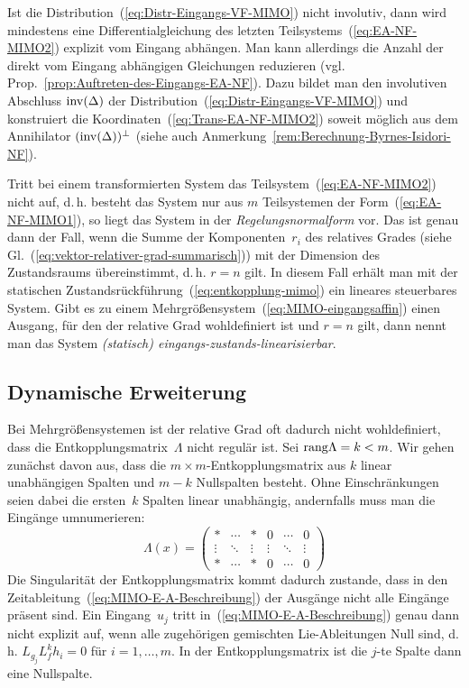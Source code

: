 Ist die Distribution~(\ref{eq:Distr-Eingangs-VF-MIMO}) nicht involutiv,
dann wird mindestens eine Differentialgleichung des letzten Teilsystems~(\ref{eq:EA-NF-MIMO2})
explizit vom Eingang abhängen. Man kann allerdings die Anzahl der
direkt vom Eingang abhängigen Gleichungen reduzieren (vgl. Prop.~\ref{prop:Auftreten-des-Eingangs-EA-NF}).
Dazu bildet man den involutiven Abschluss ${\operatorname{inv}}(\Delta)$ der Distribution~(\ref{eq:Distr-Eingangs-VF-MIMO})
und konstruiert die Koordinaten~(\ref{eq:Trans-EA-NF-MIMO2}) soweit
möglich aus dem Annihilator $({\operatorname{inv}}(\Delta))^{\perp}$ (siehe auch
Anmerkung~\ref{rem:Berechnung-Byrnes-Isidori-NF}).

\medskip{}

Tritt bei einem transformierten System das Teilsystem~(\ref{eq:EA-NF-MIMO2})
nicht auf, d.\,h. besteht das System nur aus $m$ Teilsystemen der
Form~(\ref{eq:EA-NF-MIMO1}), so liegt das System in der \emph{Regelungsnormalform}
vor. Das ist genau dann der Fall, wenn die Summe der Komponenten~$r_{i}$
des relatives Grades (siehe Gl.~(\ref{eq:vektor-relativer-grad-summarisch}))
mit der Dimension des Zustandsraums übereinstimmt, d.\,h. $r=n$
gilt. In diesem Fall erhält man mit der statischen Zustandsrückführung~(\ref{eq:entkopplung-mimo})
ein lineares steuerbares System. Gibt es zu einem Mehrgrößensystem~(\ref{eq:MIMO-eingangsaffin})
einen Ausgang, für den der relative Grad wohldefiniert ist und $r=n$
gilt, dann nennt man das System \emph{(statisch) eingangs-zustands-linearisierbar}.

\subsection{Dynamische Erweiterung\label{subsec:Dynamische-Erweiterung}}

Bei Mehrgrößensystemen ist der relative Grad oft dadurch nicht wohldefiniert,
dass die Entkopplungsmatrix~$\Lambda$ nicht regulär ist. Sei ${\operatorname{rang}}\Lambda=k<m$.
Wir gehen zunächst davon aus, dass die $m\times m$-Entkopplungsmatrix
aus $k$ linear unabhängigen Spalten und $m-k$ Nullspalten besteht.
Ohne Einschränkungen seien dabei die ersten~$k$ Spalten linear unabhängig,
andernfalls muss man die Eingänge umnumerieren:
\begin{equation}
\Lambda(x)=\left(\begin{array}{ccc|ccc}
* & \cdots & * & 0 & \cdots & 0\\
\vdots & \ddots & \vdots & \vdots & \ddots & \vdots\\
* & \cdots & * & 0 & \cdots & 0
\end{array}\right)\label{eq:Entkopplungsmatrix-Nullspalten}
\end{equation}
Die Singularität der Entkopplungsmatrix kommt dadurch zustande, dass
in den Zeitableitung~(\ref{eq:MIMO-E-A-Beschreibung}) der Ausgänge
nicht alle Eingänge präsent sind. Ein Eingang~$u_{j}$ tritt in~(\ref{eq:MIMO-E-A-Beschreibung})
genau dann nicht explizit auf, wenn alle zugehörigen gemischten Lie-Ableitungen
Null sind, d.\,h. $L_{g_{j}}L_{f}^{k}h_{i}=0$ für $i=1,\ldots,m$.
In der Entkopplungsmatrix ist die $j$-te Spalte dann eine Nullspalte. 

